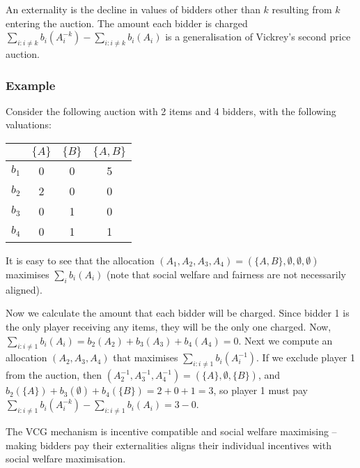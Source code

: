 			An externality is the decline in values of bidders other than $k$
			resulting from $k$ entering the auction. The amount each bidder is
			charged $\sum_{i: i \neq k} b_i(A_i^{-k}) - \sum_{i: i \neq k}
			b_i(A_i)$ is a generalisation of Vickrey's second price auction.

			\subsubsection{Example}
				Consider the following auction with 2 items and 4 bidders, with
				the following valuations:
				\begin{center}
					\begin{tabular}{|c|c|c|c|}
						\hline
						& $\{A\}$ & $\{B\}$ & $\{A,B\}$ \\ \hline
						$b_1$ & 0 & 0 & 5 \\ 
						$b_2$ & 2 & 0 & 0 \\ 
						$b_3$ & 0 & 1 & 0 \\ 
						$b_4$ & 0 & 1 & 1 \\ \hline
					\end{tabular}
				\end{center}

				It is easy to see that the allocation $(A_1, A_2, A_3, A_4) =
				(\{A,B\}, \emptyset, \emptyset, \emptyset)$ maximises $\sum_i
				b_i(A_i)$ (note that social welfare and fairness are not
				necessarily aligned).

				Now we calculate the amount that each bidder will be charged.
				Since bidder 1 is the only player receiving any items, they
				will be the only one charged. Now, $\sum_{i: i \neq 1} b_i(A_i)
				= b_2(A_2) + b_3(A_3) + b_4(A_4) = 0$. Next we compute an
				allocation $(A_2, A_3, A_4)$ that maximises $\sum_{i: i \neq 1}
				b_i(A_i^{-1})$. If we exclude player 1 from the auction, then
				$(A_2^{-1}, A_3^{-1}, A_4^{-1}) = (\{A\}, \emptyset, \{B\})$,
				and $b_2(\{A\}) + b_3(\emptyset) + b_4(\{B\}) = 2+0+1 = 3$, so
				player 1 must pay $\sum_{i: i \neq 1} b_i(A_i^{-k}) - \sum_{i:
				i \neq 1} b_i(A_i) = 3 - 0$.

				\begin{theorem}
					The VCG mechanism is incentive compatible and social
					welfare maximising -- making bidders pay their
					externalities aligns their individual incentives with
					social welfare maximisation.
				\end{theorem}

